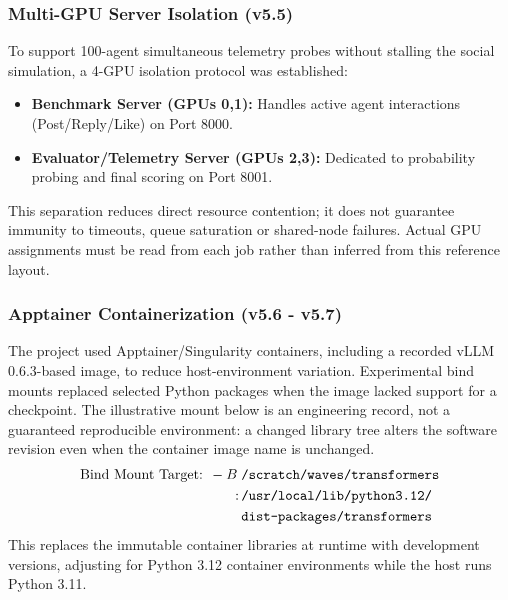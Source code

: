 \subsubsection{Multi-GPU Server Isolation (v5.5)}
To support 100-agent simultaneous telemetry probes without stalling the social simulation, a 4-GPU isolation protocol was established:
\begin{itemize}
    \item \textbf{Benchmark Server (GPUs 0,1):} Handles active agent interactions (Post/Reply/Like) on Port 8000.
    \item \textbf{Evaluator/Telemetry Server (GPUs 2,3):} Dedicated to probability probing and final scoring on Port 8001.
\end{itemize}
This separation reduces direct resource contention; it does not guarantee immunity to timeouts, queue saturation or shared-node failures. Actual GPU assignments must be read from each job rather than inferred from this reference layout.

\subsubsection{Apptainer Containerization (v5.6 - v5.7)}
The project used Apptainer/Singularity containers, including a recorded vLLM 0.6.3-based image, to reduce host-environment variation. Experimental bind mounts replaced selected Python packages when the image lacked support for a checkpoint. The illustrative mount below is an engineering record, not a guaranteed reproducible environment: a changed library tree alters the software revision even when the container image name is unchanged.
\begin{equation}
    \begin{split}
    \text{Bind Mount Target: } -B \; &\text{\texttt{/scratch/waves/transformers}} \\
    :\,&\text{\texttt{/usr/local/lib/python3.12/}} \\
     &\text{\texttt{dist-packages/transformers}}
    \end{split}
\end{equation}
This replaces the immutable container libraries at runtime with development versions, adjusting for Python 3.12 container environments while the host runs Python 3.11.

